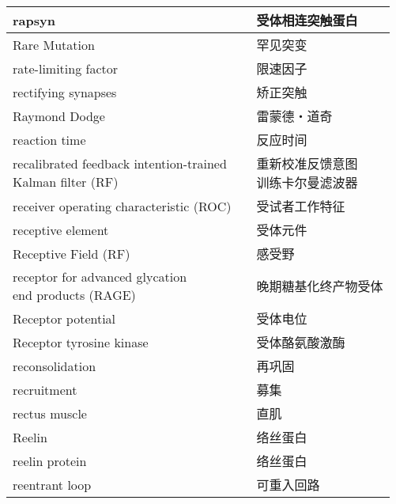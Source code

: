 \begin{longtable}{lll}
	\midrule
	rapsyn  && 受体相连突触蛋白  \\
	
	\midrule
	Rare Mutation  && 罕见突变  \\
	
	\midrule
	rate-limiting factor  && 限速因子  \\
	
	\midrule
	rectifying synapses  && 矫正突触  \\
	
	\midrule
	Raymond Dodge  && 雷蒙德・道奇  \\
	
	\midrule
	reaction time  && 反应时间  \\
	
	\midrule
	\makecell[l]{recalibrated feedback intention-trained\\ Kalman filter (RF)}   && \makecell[l]{重新校准反馈意图\\训练卡尔曼滤波器}  \\
	
	\midrule
	receiver operating characteristic (ROC)   && 受试者工作特征  \\
	
	\midrule
	receptive element   && 受体元件  \\
	
	\midrule
	Receptive Field (RF)   && 感受野  \\
	
	\midrule
	\makecell[l]{receptor for advanced glycation \\end products (RAGE)}   && 晚期糖基化终产物受体  \\
	
	\midrule
	Receptor potential   && 受体电位  \\
	
	\midrule
	Receptor tyrosine kinase   && 受体酪氨酸激酶  \\
	
	\midrule
	reconsolidation   && 再巩固  \\
	
	\midrule
	recruitment   && 募集  \\
	
	\midrule
	rectus muscle   && 直肌  \\
	
	\midrule
	Reelin   && 络丝蛋白  \\
	
	\midrule
	reelin protein   && 络丝蛋白  \\
	
	\midrule
	reentrant loop   && 可重入回路  \\
	

\end{longtable}
